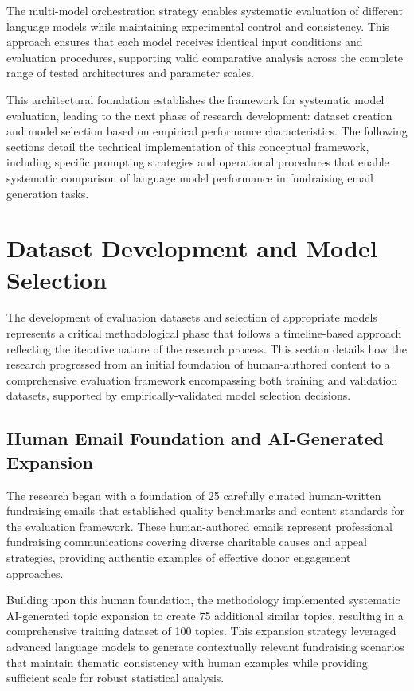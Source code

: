 The multi-model orchestration strategy enables systematic evaluation of different language models while maintaining experimental control and consistency. This approach ensures that each model receives identical input conditions and evaluation procedures, supporting valid comparative analysis across the complete range of tested architectures and parameter scales.

This architectural foundation establishes the framework for systematic model evaluation, leading to the next phase of research development: dataset creation and model selection based on empirical performance characteristics. The following sections detail the technical implementation of this conceptual framework, including specific prompting strategies and operational procedures that enable systematic comparison of language model performance in fundraising email generation tasks.

\section{Dataset Development and Model Selection}
\label{sec:dataset-model-selection}

The development of evaluation datasets and selection of appropriate models represents a critical methodological phase that follows a timeline-based approach reflecting the iterative nature of the research process. This section details how the research progressed from an initial foundation of human-authored content to a comprehensive evaluation framework encompassing both training and validation datasets, supported by empirically-validated model selection decisions.

\subsection{Human Email Foundation and AI-Generated Expansion}

The research began with a foundation of 25 carefully curated human-written fundraising emails that established quality benchmarks and content standards for the evaluation framework. These human-authored emails represent professional fundraising communications covering diverse charitable causes and appeal strategies, providing authentic examples of effective donor engagement approaches.

Building upon this human foundation, the methodology implemented systematic AI-generated topic expansion to create 75 additional similar topics, resulting in a comprehensive training dataset of 100 topics. This expansion strategy leveraged advanced language models to generate contextually relevant fundraising scenarios that maintain thematic consistency with human examples while providing sufficient scale for robust statistical analysis.

